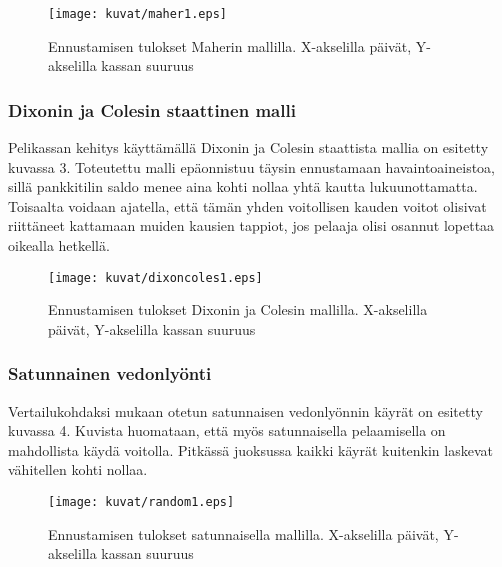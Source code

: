 \documentclass[a4paper,finnish,titlepage,12pt]{article}
\begin{document}
\begin{center}
\begin{figure}[h!]
\texttt{[image: kuvat/maher1.eps]}
\caption{Ennustamisen tulokset Maherin mallilla. X-akselilla päivät, Y-akselilla kassan suuruus}
\end{figure}
\end{center}



\subsubsection{Dixonin ja Colesin staattinen malli}

Pelikassan kehitys käyttämällä Dixonin ja Colesin staattista mallia on esitetty kuvassa 3.
Toteutettu malli epäonnistuu täysin ennustamaan havaintoaineistoa, sillä pankkitilin saldo menee aina kohti nollaa yhtä kautta lukuunottamatta.
Toisaalta voidaan ajatella, että tämän yhden voitollisen kauden voitot olisivat riittäneet kattamaan muiden kausien tappiot, jos pelaaja olisi osannut lopettaa oikealla hetkellä.

\begin{center}
\begin{figure}[h!]
\texttt{[image: kuvat/dixoncoles1.eps]}
\caption{Ennustamisen tulokset Dixonin ja Colesin mallilla. X-akselilla päivät, Y-akselilla kassan suuruus}
\end{figure}
\end{center}




\subsubsection{Satunnainen vedonlyönti}

Vertailukohdaksi mukaan otetun satunnaisen vedonlyönnin käyrät on esitetty kuvassa 4.
Kuvista huomataan, että myös satunnaisella pelaamisella on mahdollista käydä voitolla.
Pitkässä juoksussa kaikki käyrät kuitenkin laskevat vähitellen kohti nollaa.

\begin{center}
\begin{figure}[h!]
\texttt{[image: kuvat/random1.eps]}
\caption{Ennustamisen tulokset satunnaisella mallilla. X-akselilla päivät, Y-akselilla kassan suuruus}
\end{figure}
\end{center}

\newpage
\end{document}
